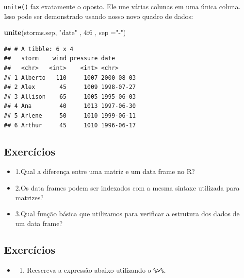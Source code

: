 \documentclass[a4paper]{book}
\newenvironment{Shaded}{\begin{snugshade}}{\end{snugshade}}
\newcommand{\DataTypeTok}[1]{\textcolor[rgb]{0.13,0.29,0.53}{#1}}
\newcommand{\DecValTok}[1]{\textcolor[rgb]{0.00,0.00,0.81}{#1}}
\newcommand{\KeywordTok}[1]{\textcolor[rgb]{0.13,0.29,0.53}{\textbf{#1}}}
\newcommand{\NormalTok}[1]{#1}
\newcommand{\OperatorTok}[1]{\textcolor[rgb]{0.81,0.36,0.00}{\textbf{#1}}}
\newcommand{\StringTok}[1]{\textcolor[rgb]{0.31,0.60,0.02}{#1}}
\providecommand{\tightlist}{%
  \setlength{\itemsep}{0pt}\setlength{\parskip}{0pt}}
\begin{document}
\texttt{unite()} faz exatamente o oposto. Ele une várias colunas em uma única coluna. Isso pode ser demonstrado usando nosso novo quadro de dados:

\begin{Shaded}
\begin{Highlighting}[]
\KeywordTok{unite}\NormalTok{(storms.sep, }\StringTok{"date"}\NormalTok{ , }\DecValTok{4}\OperatorTok{:}\DecValTok{6}\NormalTok{ , }\DataTypeTok{sep =}\StringTok{"-"}\NormalTok{)}
\end{Highlighting}
\end{Shaded}

\begin{verbatim}
## # A tibble: 6 x 4
##   storm    wind pressure date      
##   <chr>   <int>    <int> <chr>     
## 1 Alberto   110     1007 2000-08-03
## 2 Alex       45     1009 1998-07-27
## 3 Allison    65     1005 1995-06-03
## 4 Ana        40     1013 1997-06-30
## 5 Arlene     50     1010 1999-06-11
## 6 Arthur     45     1010 1996-06-17
\end{verbatim}

\hypertarget{exercuxedcios}{%
\subsection{Exercícios}\label{exercuxedcios}}

\begin{itemize}
\tightlist
\item
  1.Qual a diferença entre uma matriz e um data frame no R?
\item
  2.Os data frames podem ser indexados com a mesma sintaxe utilizada para matrizes?
\item
  3.Qual função básica que utilizamos para verificar a estrutura dos dados de um data frame?
\end{itemize}

\hypertarget{exercuxedcios-1}{%
\subsection{Exercícios}\label{exercuxedcios-1}}

\begin{itemize}
\item
  \begin{enumerate}
  \def\labelenumi{\arabic{enumi}.}
  \tightlist
  \item
    Reescreva a expressão abaixo utilizando o \texttt{\%\textgreater{}\%}.
  \end{enumerate}
\end{itemize}
\end{document}
